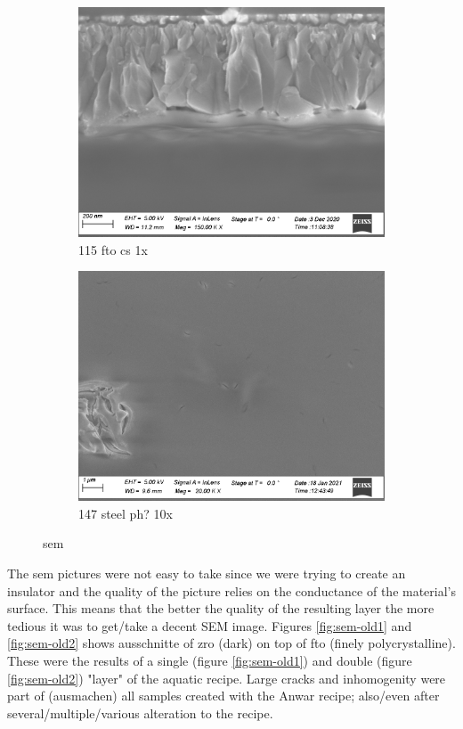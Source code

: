\begin{figure}
\begin{subfigure}{.45\textwidth}
        \includegraphics[width=.8\textwidth]{Pics/sem/115_fto_cs_1x.png}
        \caption{115 fto cs 1x} \label{fig:sem-cs1}
    \end{subfigure}
    \begin{subfigure}{.45\textwidth}
        \centering
        \includegraphics[width=.8\textwidth]{Pics/sem/147_steel_ph_10x.png}
        \caption{147 steel ph? 10x} \label{fig:sem-ph}
    \end{subfigure}
    \caption{sem}
    \label{fig:sem}
\end{figure}

The \gls{sem} pictures were not easy to take since we were trying to create an insulator 
and the quality of the picture relies on the conductance of the material's surface. 
This means that the better the quality of the resulting layer the more tedious it was to get/take a decent SEM image. 
Figures \ref{fig:sem-old1} and \ref{fig:sem-old2} shows ausschnitte of \gls{zro} (dark) on top of \gls{fto} (finely polycrystalline). 
These were the results of a single (figure \ref{fig:sem-old1}) and double (figure \ref{fig:sem-old2}) "layer" of the aquatic recipe. 
Large cracks and inhomogenity were part of (ausmachen) all samples created with the Anwar recipe; 
also/even after several/multiple/various alteration to the recipe. 

